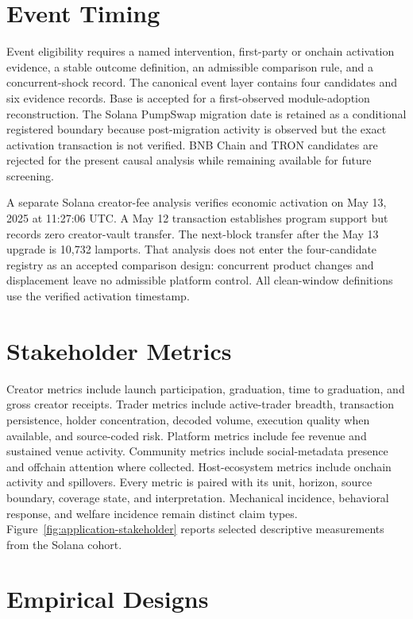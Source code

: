 \documentclass{article}
\begin{document}
\section{Event Timing}
\label{app:events}

Event eligibility requires a named intervention, first-party or onchain activation evidence, a stable outcome definition, an admissible comparison rule, and a concurrent-shock record. The canonical event layer contains four candidates and six evidence records. Base is accepted for a first-observed module-adoption reconstruction. The Solana PumpSwap migration date is retained as a conditional registered boundary because post-migration activity is observed but the exact activation transaction is not verified. BNB Chain and TRON candidates are rejected for the present causal analysis while remaining available for future screening.

A separate Solana creator-fee analysis verifies economic activation on May 13, 2025 at 11:27:06 UTC. A May 12 transaction establishes program support but records zero creator-vault transfer. The next-block transfer after the May 13 upgrade is 10{,}732 lamports. That analysis does not enter the four-candidate registry as an accepted comparison design: concurrent product changes and displacement leave no admissible platform control. All clean-window definitions use the verified activation timestamp.

\section{Stakeholder Metrics}
\label{app:metrics}

Creator metrics include launch participation, graduation, time to graduation, and gross creator receipts. Trader metrics include active-trader breadth, transaction persistence, holder concentration, decoded volume, execution quality when available, and source-coded risk. Platform metrics include fee revenue and sustained venue activity. Community metrics include social-metadata presence and offchain attention where collected. Host-ecosystem metrics include onchain activity and spillovers. Every metric is paired with its unit, horizon, source boundary, coverage state, and interpretation. Mechanical incidence, behavioral response, and welfare incidence remain distinct claim types. Figure~\ref{fig:application-stakeholder} reports selected descriptive measurements from the Solana cohort.

\section{Empirical Designs}
\label{app:empirical-designs}
\end{document}
